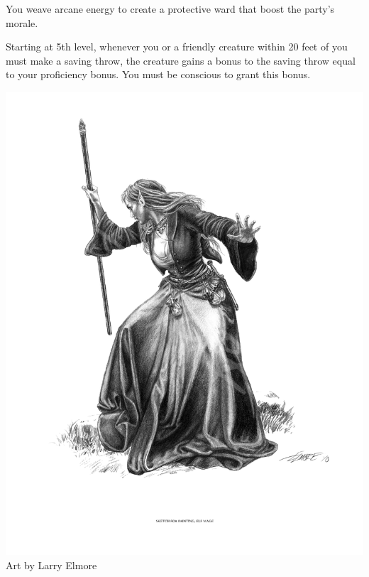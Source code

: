 \begin{multicols*}{2}
You weave arcane energy to create a protective ward that boost the party's morale.

Starting at 5th level, whenever you or a friendly creature within 20 feet of you must make a saving throw, the creature gains a bonus to the saving throw equal to your proficiency bonus. You must be conscious to grant this bonus.


\begin{Figure}
\centering
\includegraphics[width=\textwidth]{img/mender.png}
{\scriptsize Art by Larry Elmore}
\end{Figure}



    
\end{multicols*}

\clearpage






    